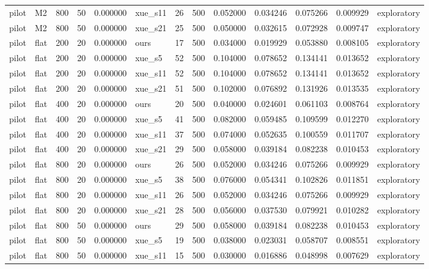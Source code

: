 \begin{longtable}{llrrrlrrrrrrl}
pilot & M2 & 800 & 50 & 0.000000 & xue\_s11 & 26 & 500 & 0.052000 & 0.034246 & 0.075266 & 0.009929 & exploratory \\
pilot & M2 & 800 & 50 & 0.000000 & xue\_s21 & 25 & 500 & 0.050000 & 0.032615 & 0.072928 & 0.009747 & exploratory \\
pilot & flat & 200 & 20 & 0.000000 & ours & 17 & 500 & 0.034000 & 0.019929 & 0.053880 & 0.008105 & exploratory \\
pilot & flat & 200 & 20 & 0.000000 & xue\_s5 & 52 & 500 & 0.104000 & 0.078652 & 0.134141 & 0.013652 & exploratory \\
pilot & flat & 200 & 20 & 0.000000 & xue\_s11 & 52 & 500 & 0.104000 & 0.078652 & 0.134141 & 0.013652 & exploratory \\
pilot & flat & 200 & 20 & 0.000000 & xue\_s21 & 51 & 500 & 0.102000 & 0.076892 & 0.131926 & 0.013535 & exploratory \\
pilot & flat & 400 & 20 & 0.000000 & ours & 20 & 500 & 0.040000 & 0.024601 & 0.061103 & 0.008764 & exploratory \\
pilot & flat & 400 & 20 & 0.000000 & xue\_s5 & 41 & 500 & 0.082000 & 0.059485 & 0.109599 & 0.012270 & exploratory \\
pilot & flat & 400 & 20 & 0.000000 & xue\_s11 & 37 & 500 & 0.074000 & 0.052635 & 0.100559 & 0.011707 & exploratory \\
pilot & flat & 400 & 20 & 0.000000 & xue\_s21 & 29 & 500 & 0.058000 & 0.039184 & 0.082238 & 0.010453 & exploratory \\
pilot & flat & 800 & 20 & 0.000000 & ours & 26 & 500 & 0.052000 & 0.034246 & 0.075266 & 0.009929 & exploratory \\
pilot & flat & 800 & 20 & 0.000000 & xue\_s5 & 38 & 500 & 0.076000 & 0.054341 & 0.102826 & 0.011851 & exploratory \\
pilot & flat & 800 & 20 & 0.000000 & xue\_s11 & 26 & 500 & 0.052000 & 0.034246 & 0.075266 & 0.009929 & exploratory \\
pilot & flat & 800 & 20 & 0.000000 & xue\_s21 & 28 & 500 & 0.056000 & 0.037530 & 0.079921 & 0.010282 & exploratory \\
pilot & flat & 800 & 50 & 0.000000 & ours & 29 & 500 & 0.058000 & 0.039184 & 0.082238 & 0.010453 & exploratory \\
pilot & flat & 800 & 50 & 0.000000 & xue\_s5 & 19 & 500 & 0.038000 & 0.023031 & 0.058707 & 0.008551 & exploratory \\
pilot & flat & 800 & 50 & 0.000000 & xue\_s11 & 15 & 500 & 0.030000 & 0.016886 & 0.048998 & 0.007629 & exploratory \\

\end{longtable}
